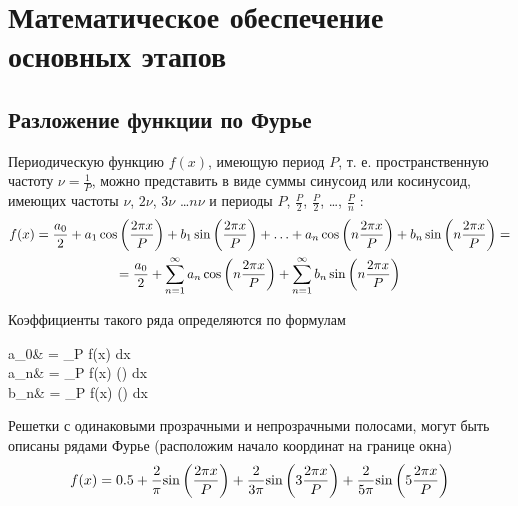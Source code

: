 \documentclass[14pt,a4paper]{extarticle}
\begin{document}
\section{Математическое обеспечение основных этапов}
\subsection{Разложение функции  по Фурье}
Периодическую функцию $f(x)$, имеющую период $P$, т. е. пространственную частоту $\nu = \frac{1}{P}$, можно представить в виде суммы синусоид или косинусоид, имеющих частоты $\nu $, $2\nu$, $3\nu$ \ldots $n\nu$   и периоды $P$, $\frac{P}{2}$, $\frac{P}{2}$, \ldots, $\frac{P}{n}$ :
\begin{multline}
	f(x) = \frac{a_0}{2} + a_{1}\cos \left({}\frac{2\pi x}{P}\right) + b_{1}\sin \left({}\frac{2\pi x}{P}\right) + \ldots + a_{n}\cos \left({n}\frac{2\pi x}{P}\right) + b_{n}\sin \left({n}\frac{2\pi x}{P}\right)= \\
	= \frac{a_0}{2} + \sum \limits _ {n = 1} ^ {\infty} a_{n}\cos \left({n}\frac{2\pi x}{P}\right) + \sum \limits _ {n = 1} ^ {\infty} b_{n}\sin \left({n}\frac{2\pi x}{P}\right)
\end{multline}

Коэффициенты такого ряда определяются по формулам
\begin{aleq}
	a_0& =  \int \limits _{P} f(x) dx \\
	a_n& =  \int \limits _{P} f(x) \cos \left(\right) dx \\
	b_n& =  \int \limits _{P} f(x) \sin \left(\right) dx
\end{aleq}

Решетки с одинаковыми прозрачными и непрозрачными полосами, могут быть описаны рядами Фурье (расположим начало координат на границе окна)
\begin{equation}
	f(x) = 0.5 + \frac{2}{{}\pi}{\sin}\left({}\frac{2\pi x}{P}\right) + \frac{2}{{3}\pi}{\sin}\left({3}\frac{2\pi x}{P}\right) + \frac{2}{{5}\pi}{\sin}\left({5}\frac{2\pi x}{P}\right)
\end{equation}
\end{document}
